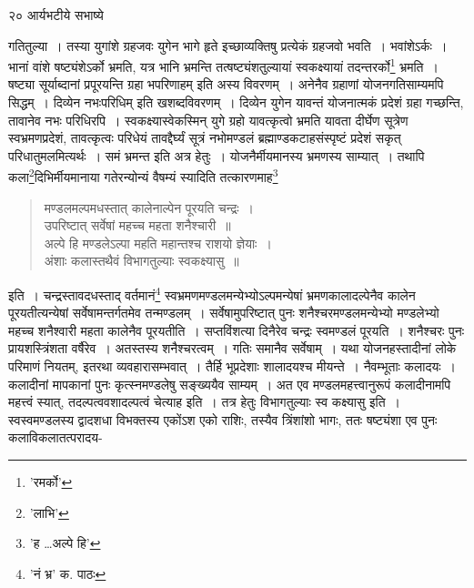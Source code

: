 \documentclass[11pt, openany]{book}
\begin{document}
{\newpage

\vspace{3cm} २०\hspace{4cm} आर्यभटीये सभाष्ये

\vspace{0.3cm}
\noindent गतितुल्या~। तस्या युगांशे ग्रहजवः युगेन भागे हृते इच्छाव्यक्तिषु प्रत्येकं ग्रहजवो भवति~। भवांशेऽर्कः~। भानां वांशे षष्ट्यंशेऽर्को भ्रमति, यत्र भानि भ्रमन्ति तत्षष्ट्यंशतुल्यायां स्वकक्ष्यायां तदन्तरर्को\renewcommand{\thefootnote}{१}\footnote{'रमर्को'} भ्रमति~। {\qt षष्ट्या सूर्याब्दानां प्रपूरयन्ति ग्रहा भपरिणाहम्} इति अस्य विवरणम्~। अनेनैव ग्रहाणां योजनगतिसाम्यमपि सिद्धम्~। {\qt दिव्येन नभःपरिधिम्} इति खशब्दविवरणम्~।
दिव्येन युगेन यावन्तं योजनात्मकं प्रदेशं ग्रहा गच्छन्ति, तावानेव नभः परिधिरपि~। स्वकक्ष्यास्वेकस्मिन् युगे ग्रहो यावत्कृत्वो भ्रमति यावता
दीर्घेण सूत्रेण स्वभ्रमणप्रदेशं, तावत्कृत्वः परिधेयं तावद्दैर्घ्यं सूत्रं नभोमण्डलं ब्रह्माण्डकटाहसंस्पृष्टं प्रदेशं सकृत् परिधातुमलमित्यर्थः~। {\qt समं
भ्रमन्त} इति अत्र हेतुः~। योजनैर्मीयमानस्य भ्रमणस्य साम्यात्~। तथापि कला\renewcommand{\thefootnote}{२}\footnote{'लाभि'}दिभिर्मीयमानाया गतेरन्योन्यं वैषम्यं स्यादिति तत्कारणमाह\renewcommand{\thefootnote}{३}\footnote{'ह \ldots अल्पे हि'}\textendash

\begin{quote}
{\qt मण्डलमल्पमधस्तात् कालेनाल्पेन पूरयति चन्द्रः~।\\
उपरिष्टात् सर्वेषां महच्च महता शनैश्चारी~॥\\
अल्पे हि मण्डलेऽल्पा महति महान्तश्च राशयो ज्ञेयाः~।\\
अंशाः कलास्तथैवं विभागतुल्याः स्वकक्ष्यासु~॥}
\end{quote}

\noindent इति~। चन्द्रस्तावदधस्ताद् वर्तमानं\renewcommand{\thefootnote}{४}\footnote{'नं भ्र' क. पाठः} स्वभ्रमणमण्डलमन्येभ्योऽल्पमन्येषां भ्रमणकालादल्पेनैव कालेन पूरयतीत्यन्येषां सर्वेषामन्तर्गतमेव तन्मण्डलम्~। सर्वेषामुपरिष्टात् पुनः शनैश्चरमण्डलमन्येभ्यो मण्डलेभ्यो महच्च शनैश्वारी महता कालेनैव पूरयतीति~। सप्तविंशत्या दिनैरेव चन्द्रः स्वमण्डलं पूरयति~। शनैश्चरः पुनः प्रायशस्त्रिंशता वर्षैरेव~। अतस्तस्य शनैश्चरत्वम्~। गतिः समानैव सर्वेषाम्~। यथा योजनहस्तादीनां लोके परिमाणं नियतम्, इतरथा व्यवहारासम्भवात्~। तैर्हि भूप्रदेशाः शालादयश्च मीयन्ते~। नैवम्भूताः कलादयः~। कलादीनां मापकानां पुनः कृत्स्नमण्डलेषु सङ्ख्ययैव साम्यम्~। अत एव मण्डलमहत्त्वानुरूपं कलादीनामपि महत्त्वं स्यात्, तदल्पत्ववशादल्पत्वं चेत्याह  इति~। तत्र हेतुः {\qt विभागतुल्याः स्व कक्ष्यासु} इति~। स्वस्वमण्डलस्य द्वादशधा विभक्तस्य एकोंऽश एको राशिः,
तस्यैव त्रिंशांशो भागः, ततः षष्ट्यंशा एव पुनः कलाविकलातत्परादय-


}
\end{document}

